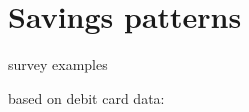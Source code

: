 
\section{Savings patterns}%
\label{sec:savings_patterns}

survey examples

based on debit card data:


